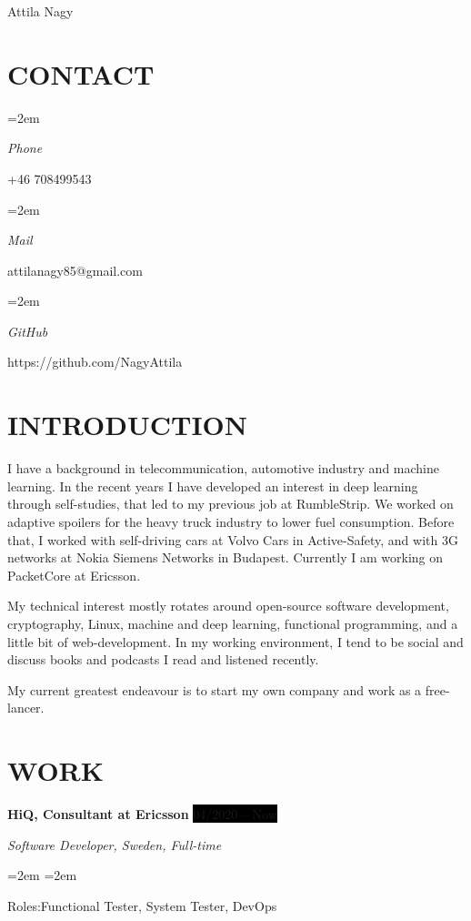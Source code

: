 \documentclass[paper=a4,fontsize=11pt]{scrartcl}	 			%
\newlength{\spacebox}
\newcommand{\MyName}[1]{
		\Huge \usefont{OT1}{phv}{b}{n} \hfill #1 		%
		\par \normalsize \normalfont}
\newcommand{\MySlogan}[1]{
		\large \usefont{OT1}{phv}{m}{n}\hfill \textit{#1} %
		\par \normalsize \normalfont}
\newcommand{\NewPart}[1]{\section*{\uppercase{#1}}}
\newcommand{\PersonalEntry}[2]{
		\noindent\hangindent=2em\hangafter=0 		%
		\parbox{\spacebox}{						%
		\textit{#1}}								%
		\hspace{1.5em} #2 \par}					%
\newcommand{\SkillsEntry}[2]{						%
		\noindent\hangindent=2em\hangafter=0 		%
		\parbox{\spacebox}{						%
		\textit{#1}}								%
		\hspace{1.5em} #2 \par}					%
\newcommand{\EducationEntry}[4]{
		\noindent \textbf{#1} \par 					%
		\noindent \textit{#3} \hfill				%
		\colorbox{Black}{%
			\hfill\color{White}#2} \par				%
		\noindent\hangindent=2em\hangafter=0 \small #4 	%
		\normalsize \par
    }
\newcommand{\WorkEntry}[4]{					        %
		\noindent \textbf{#1} \hfill 				%
		\colorbox{Black}{\color{White}#2} \par		%
		\noindent \textit{#3} \par					%
		\noindent\hangindent=2em\hangafter=0 \small #4 	%
		\normalsize \par}
\begin{document}
\MyName{Attila Nagy}

\NewPart{Contact}{}

\PersonalEntry{Phone}{+46 708499543}
\PersonalEntry{Mail}{attilanagy85@gmail.com}
\PersonalEntry{GitHub}{https://github.com/NagyAttila}

\NewPart{Introduction}{}

I have a background in telecommunication, automotive industry and machine learning. In the recent years I have developed an interest in deep learning through self-studies, that led to my previous job at RumbleStrip. We worked on adaptive spoilers for the heavy truck industry to lower fuel consumption. Before that, I worked with self-driving cars at Volvo Cars in Active-Safety, and with 3G networks at Nokia Siemens Networks in Budapest. Currently I am working on PacketCore at Ericsson.

My technical interest mostly rotates around open-source software development, cryptography, Linux, machine and deep learning, functional programming, and a little bit of web-development. In my working environment, I tend to be social and discuss books and podcasts I read and listened recently.

My current greatest endeavour is to start my own company and work as a free-lancer.


\NewPart{Work}{}

\WorkEntry{HiQ, Consultant at Ericsson}{04/2020 -- Now}{Software Developer, Sweden, Full-time}

\SkillsEntry{Roles:}{Functional Tester, System Tester, DevOps}
\end{document}
